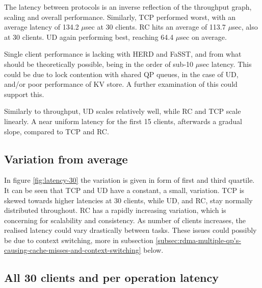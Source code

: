 The latency between protocols is an inverse reflection of the throughput graph, scaling and overall performance.
Similarly, TCP performed worst, with an average latency of 134.2 $\mu$sec at 30 clients.
RC hits an average of 113.7 $\mu$sec, also at 30 clients.
UD again performing best, reaching 64.4 $\mu$sec on average.

Single client performance is lacking with HERD\cite{kalia2014using} and FaSST\cite{kalia2016fasst}, and from what should be theoretically possible, being in the order of sub-10 $\mu$sec latency.
This could be due to lock contention with shared QP queues, in the case of UD, and/or poor performance of KV store.
A further examination of this could support this.

Similarly to throughput, UD scales relatively well, while RC and TCP scale linearly.
A near uniform latency for the first 15 clients, afterwards a gradual slope, compared to TCP and RC.

\subsection{Variation from average}
In figure \ref{fig:latency-30} the variation is given in form of first and third quartile.
It can be seen that TCP and UD have a constant, a small, variation.
TCP is skewed towards higher latencies at 30 clients, while UD, and RC, stay normally distributed throughout.
RC has a rapidly increasing variation, which is concerning for scalability and consistency.
As number of clients increases, the realised latency could vary drastically between tasks.
These issues could possibly be due to context switching, more in subsection \ref{subsec:rdma-multiple-qp's-causing-cache-misses-and-context-switching} below.

\subsection{All 30 clients and per operation latency}\label{subsec:all-30-clients-and-per-operation-latency}

